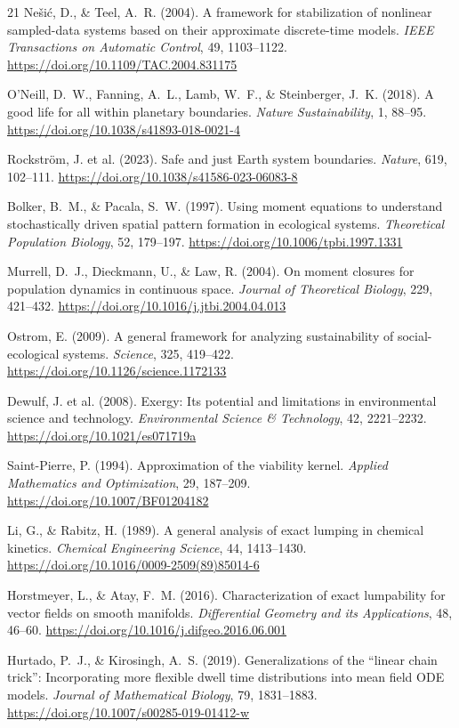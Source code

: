 \documentclass[11pt]{article}
\theoremstyle{definition}
\begin{document}
\begin{thebibliography}{21}
 Ne\v{s}i\'c, D., \& Teel, A.~R. (2004). A framework for stabilization of nonlinear sampled-data systems based on their approximate discrete-time models. \textit{IEEE Transactions on Automatic Control}, 49, 1103--1122. \url{https://doi.org/10.1109/TAC.2004.831175}

 O'Neill, D.~W., Fanning, A.~L., Lamb, W.~F., \& Steinberger, J.~K. (2018). A good life for all within planetary boundaries. \textit{Nature Sustainability}, 1, 88--95. \url{https://doi.org/10.1038/s41893-018-0021-4}

 Rockstr\"om, J. et al. (2023). Safe and just Earth system boundaries. \textit{Nature}, 619, 102--111. \url{https://doi.org/10.1038/s41586-023-06083-8}

 Bolker, B.~M., \& Pacala, S.~W. (1997). Using moment equations to understand stochastically driven spatial pattern formation in ecological systems. \textit{Theoretical Population Biology}, 52, 179--197. \url{https://doi.org/10.1006/tpbi.1997.1331}

 Murrell, D.~J., Dieckmann, U., \& Law, R. (2004). On moment closures for population dynamics in continuous space. \textit{Journal of Theoretical Biology}, 229, 421--432. \url{https://doi.org/10.1016/j.jtbi.2004.04.013}

 Ostrom, E. (2009). A general framework for analyzing sustainability of social-ecological systems. \textit{Science}, 325, 419--422. \url{https://doi.org/10.1126/science.1172133}

 Dewulf, J. et al. (2008). Exergy: Its potential and limitations in environmental science and technology. \textit{Environmental Science \& Technology}, 42, 2221--2232. \url{https://doi.org/10.1021/es071719a}

 Saint-Pierre, P. (1994). Approximation of the viability kernel. \textit{Applied Mathematics and Optimization}, 29, 187--209. \url{https://doi.org/10.1007/BF01204182}

 Li, G., \& Rabitz, H. (1989). A general analysis of exact lumping in chemical kinetics. \textit{Chemical Engineering Science}, 44, 1413--1430. \url{https://doi.org/10.1016/0009-2509(89)85014-6}

 Horstmeyer, L., \& Atay, F.~M. (2016). Characterization of exact lumpability for vector fields on smooth manifolds. \textit{Differential Geometry and its Applications}, 48, 46--60. \url{https://doi.org/10.1016/j.difgeo.2016.06.001}

 Hurtado, P.~J., \& Kirosingh, A.~S. (2019). Generalizations of the ``linear chain trick'': Incorporating more flexible dwell time distributions into mean field ODE models. \textit{Journal of Mathematical Biology}, 79, 1831--1883. \url{https://doi.org/10.1007/s00285-019-01412-w}
\end{thebibliography}
\end{document}
